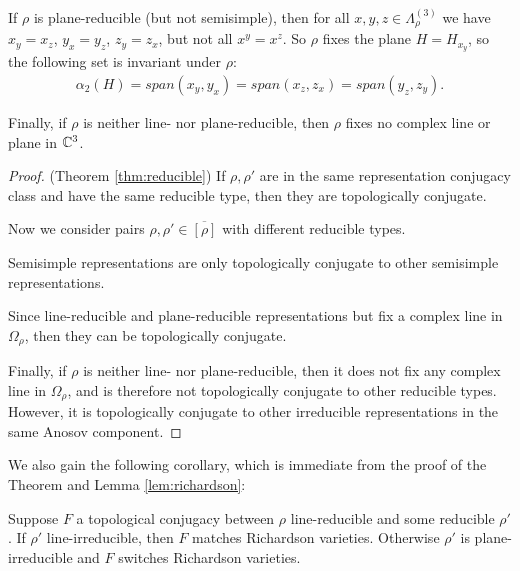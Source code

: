 If $\rho$ is plane-reducible (but not semisimple), 
then for all $x,y,z \in \Lambda_\rho^{(3)}$ we have
$x_y = x_z$, $y_x = y_z$, $z_y=z_x$, but not all $x^y = x^z$.
So $\rho$ fixes the plane $H = H_{x_y}$, so the following set is invariant under $\rho$:
\begin{align}
    \alpha_2(H) = span(x_y,y_x)=span(x_z,z_x)=span(y_z,z_y).
\end{align}

Finally, if $\rho$ is neither line- nor plane-reducible,
then $\rho$ fixes no complex line or plane in $\mathbb{C}^3$.
\begin{proof}(Theorem \ref{thm:reducible})
If $\rho,\rho'$ are in the same representation conjugacy class
and have the same reducible type, then they are topologically conjugate.

Now we consider pairs $\rho,\rho' \in \overline{[\rho]}$ with different reducible types. 

Semisimple representations are only topologically conjugate to other
semisimple representations.

Since line-reducible and plane-reducible representations
but fix a complex line in $\Omega_\rho$, 
then they can be topologically conjugate.

Finally, if $\rho$ is neither line- nor plane-reducible, 
then it does not fix any complex line in $\Omega_\rho$, 
and is therefore not topologically conjugate to other reducible types. 
However, it is topologically conjugate to other
irreducible representations in the same Anosov component.
\end{proof}

We also gain the following corollary, 
which is immediate from the proof of the Theorem and Lemma \ref{lem:richardson}:
\begin{corollary}
    Suppose $F$ a topological conjugacy between $\rho$ line-reducible and some reducible $\rho'$.
    If $\rho'$ line-irreducible, then $F$ matches Richardson varieties.
    Otherwise $\rho'$ is plane-irreducible and $F$ switches Richardson varieties.
\end{corollary}

